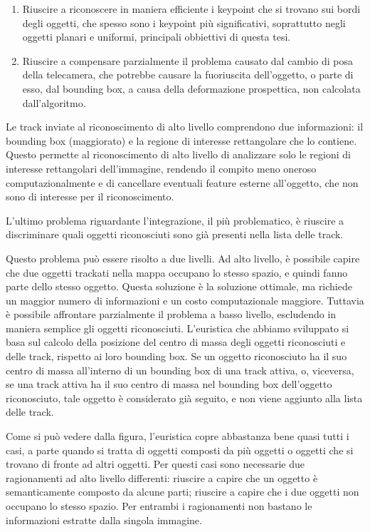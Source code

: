 \begin{enumerate}
 \item Riuscire a riconoscere in maniera efficiente i keypoint che si trovano sui bordi degli oggetti, che spesso sono i keypoint più significativi, soprattutto negli oggetti planari e uniformi, principali obbiettivi di questa tesi.
 \item Riuscire a compensare parzialmente il problema causato dal cambio di posa della telecamera, che potrebbe causare la fuoriuscita dell'oggetto, o parte di esso, dal bounding box, a causa della deformazione prospettica, non calcolata dall'algoritmo.
\end{enumerate}

Le track inviate al riconoscimento di alto livello comprendono due informazioni: il bounding box (maggiorato) e la regione di interesse rettangolare che lo contiene. Questo permette al riconoscimento di alto livello di analizzare solo le regioni di interesse rettangolari dell'immagine, rendendo il compito meno oneroso computazionalmente e di cancellare eventuali feature esterne all'oggetto, che non sono di interesse per il riconoscimento.

L'ultimo problema riguardante l'integrazione, il più problematico, è riuscire a discriminare quali oggetti riconosciuti sono già presenti nella lista delle track.

Questo problema può essere risolto a due livelli. Ad alto livello, è possibile capire che due oggetti trackati nella mappa occupano lo stesso spazio, e quindi fanno parte dello stesso oggetto. Questa soluzione è la soluzione ottimale, ma richiede un maggior numero di informazioni e un costo computazionale maggiore. 
Tuttavia è possibile affrontare parzialmente il problema a basso livello, escludendo in maniera semplice gli oggetti riconosciuti.
L'euristica che abbiamo sviluppato si basa sul calcolo della posizione del centro di massa degli oggetti riconosciuti e delle track, rispetto ai loro bounding box.
Se un oggetto riconosciuto ha il suo centro di massa all'interno di un bounding box di una track attiva, o, viceversa, se una track attiva ha il suo centro di massa nel bounding box dell'oggetto riconosciuto, tale oggetto è considerato già seguito, e non viene aggiunto alla lista delle track.

Come si può vedere dalla figura, %
l'euristica copre abbastanza bene quasi tutti i casi, a parte quando si tratta di oggetti composti da più oggetti o oggetti che si trovano di fronte ad altri oggetti. Per questi casi sono necessarie due ragionamenti ad alto livello differenti: riuscire a capire che un oggetto è semanticamente composto da alcune parti; riuscire a capire che i due oggetti non occupano lo stesso spazio. Per entrambi i ragionamenti non bastano le informazioni estratte dalla singola immagine.

